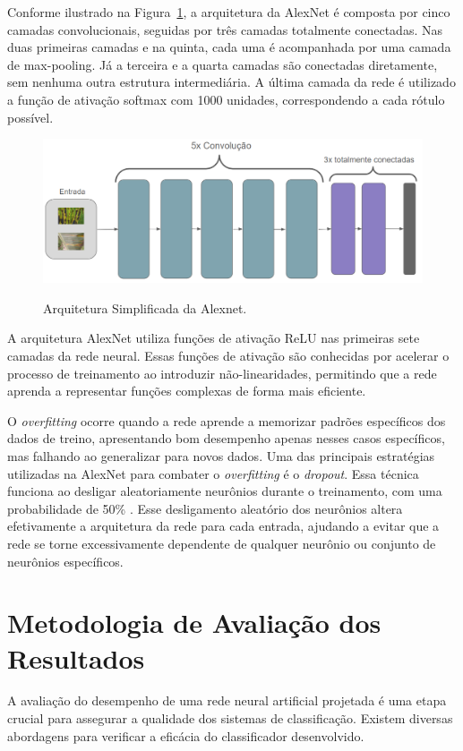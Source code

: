 Conforme ilustrado na Figura~\ref{Fig:ArquitAlexnet}, a arquitetura da AlexNet é composta por cinco camadas convolucionais, seguidas por três camadas totalmente conectadas. Nas duas primeiras camadas e na quinta, cada uma é acompanhada por uma camada de max-pooling. Já a terceira e a quarta camadas são conectadas diretamente, sem nenhuma outra estrutura intermediária. A última camada da rede é utilizado a função de ativação softmax com 1000 unidades, correspondendo a cada rótulo possível.

\begin{figure}[!h]
	\centering
	\caption{Arquitetura Simplificada da Alexnet.}
	\includegraphics[width=15cm]{figuras/ArquitAlexnet.png}\\
	\label{Fig:ArquitAlexnet}
\end{figure}

A arquitetura AlexNet utiliza funções de ativação \ac{ReLU} nas primeiras sete camadas da rede neural. Essas funções de ativação são conhecidas por acelerar o processo de treinamento ao introduzir não-linearidades, permitindo que a rede aprenda a representar funções complexas de forma mais eficiente.

O \textit{overfitting} ocorre quando a rede aprende a memorizar padrões específicos dos dados de treino, apresentando bom desempenho apenas nesses casos específicos, mas falhando ao generalizar para novos dados. Uma das principais estratégias utilizadas na AlexNet para combater o \textit{overfitting} é o \textit{dropout}. Essa técnica funciona ao desligar aleatoriamente neurônios durante o treinamento, com uma probabilidade de 50\% \cite{braga2021avaliacao}. Esse desligamento aleatório dos neurônios altera efetivamente a arquitetura da rede para cada entrada, ajudando a evitar que a rede se torne excessivamente dependente de qualquer neurônio ou conjunto de neurônios específicos.

\section{Metodologia de Avaliação dos Resultados}
A avaliação do desempenho de uma rede neural artificial projetada é uma etapa crucial para assegurar a qualidade dos sistemas de classificação. Existem diversas abordagens para verificar a eficácia do classificador desenvolvido.

